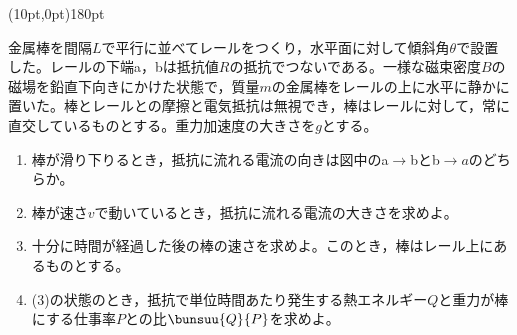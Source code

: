 \hakosyokika
\item
    \begin{mawarikomi}(10pt,0pt){180pt}{
        
    }
    金属棒を間隔$L$で平行に並べてレールをつくり，水平面に対して傾斜角$\theta $で設置した。レールの下端a，bは抵抗値$R$\tanni{\Omega }の抵抗でつないである。一様な磁束密度$B$の磁場を鉛直下向きにかけた状態で，質量$m$の金属棒をレールの上に水平に静かに置いた。棒とレールとの摩擦と電気抵抗は無視でき，棒はレールに対して，常に直交しているものとする。重力加速度の大きさを$g$とする。
        \begin{enumerate}
            \item 棒が滑り下りるとき，抵抗に流れる電流の向きは図中のa$\rightarrow$bとb$\rightarrow a$のどちらか。
            \item 棒が速さ$v$で動いているとき，抵抗に流れる電流の大きさを求めよ。
            \item 十分に時間が経過した後の棒の速さを求めよ。このとき，棒はレール上にあるものとする。
            \item (3)の状態のとき，抵抗で単位時間あたり発生する熱エネルギー$Q$と重力が棒にする仕事率$P$との比$\bunsuu{Q}{P}$を求めよ。
        \end{enumerate}
    \end{mawarikomi}